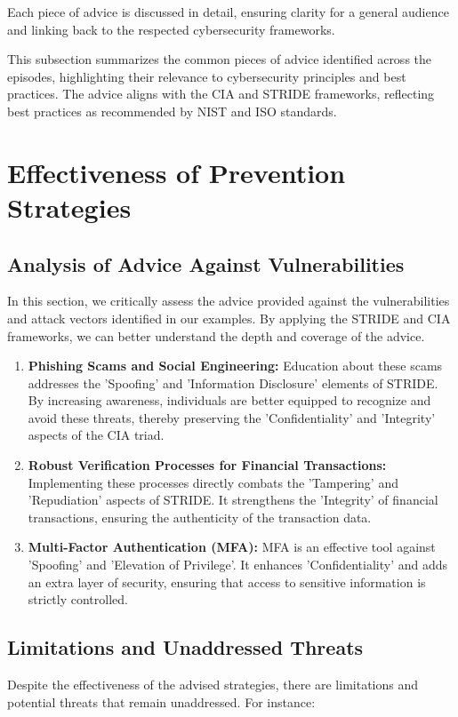 \documentclass[11pt]{article}
\begin{document}
Each piece of advice is discussed in detail, ensuring clarity for a general audience and linking back to the respected cybersecurity frameworks.

This subsection summarizes the common pieces of advice identified across the episodes, highlighting their relevance to cybersecurity principles and best practices. The advice aligns with the CIA and STRIDE frameworks, reflecting best practices as recommended by NIST and ISO standards.

\section{Effectiveness of Prevention Strategies}
\subsection{Analysis of Advice Against Vulnerabilities}
In this section, we critically assess the advice provided against the vulnerabilities and attack vectors identified in our examples. By applying the STRIDE and CIA frameworks, we can better understand the depth and coverage of the advice.

\begin{enumerate}
    \item \textbf{Phishing Scams and Social Engineering:} Education about these scams addresses the 'Spoofing' and 'Information Disclosure' elements of STRIDE. By increasing awareness, individuals are better equipped to recognize and avoid these threats, thereby preserving the 'Confidentiality' and 'Integrity' aspects of the CIA triad.
    \item \textbf{Robust Verification Processes for Financial Transactions:} Implementing these processes directly combats the 'Tampering' and 'Repudiation' aspects of STRIDE. It strengthens the 'Integrity' of financial transactions, ensuring the authenticity of the transaction data.
    \item \textbf{Multi-Factor Authentication (MFA):} MFA is an effective tool against 'Spoofing' and 'Elevation of Privilege'. It enhances 'Confidentiality' and adds an extra layer of security, ensuring that access to sensitive information is strictly controlled.
\end{enumerate}

\subsection{Limitations and Unaddressed Threats}
Despite the effectiveness of the advised strategies, there are limitations and potential threats that remain unaddressed. For instance:
\end{document}
